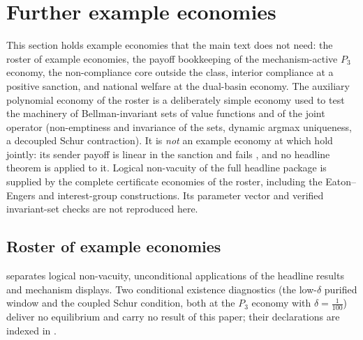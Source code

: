 \section{Further example economies}
\label{app:further-examples}

This section holds example economies that the main text does not need: the roster of
example economies, the payoff bookkeeping of the mechanism-active $P_3$ economy, the
non-compliance core outside the class, interior compliance at a positive sanction, and
national welfare at the dual-basin economy. The auxiliary polynomial economy
of the roster is a deliberately simple economy used to test the machinery of
Bellman-invariant sets of value functions and of the joint operator (non-emptiness and invariance of the sets,
dynamic argmax uniqueness, a decoupled Schur contraction). It is \emph{not} an
example economy at which  hold jointly: its
sender payoff is linear in the sanction and fails , and
no headline theorem is applied to it. Logical non-vacuity of the full
headline package is supplied by the complete certificate economies of the
roster, including the Eaton--Engers and interest-group constructions. Its
parameter vector and verified invariant-set checks are not reproduced here.

\subsection{Roster of example economies}

 separates logical non-vacuity,
unconditional applications of the headline results and mechanism displays.
Two conditional existence diagnostics (the
low-$\delta$ purified window and the coupled Schur condition, both at the $P_3$
economy with $\delta=\tfrac1{100}$) deliver no equilibrium and carry no
result of this paper; their
declarations are indexed in .

